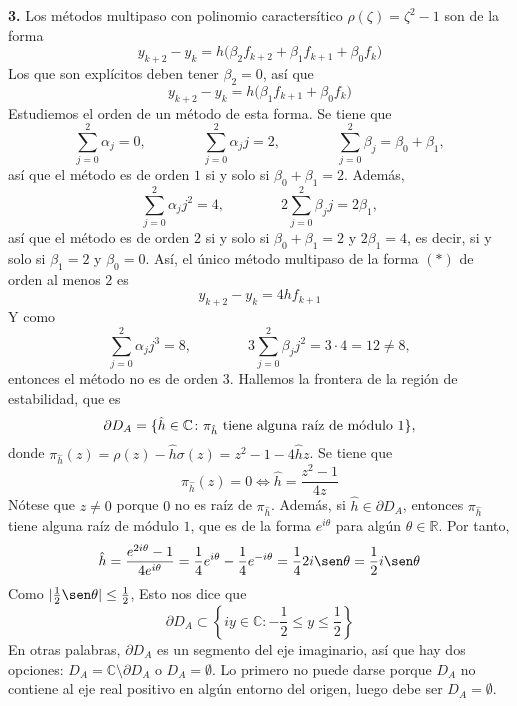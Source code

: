 \documentclass[11pt]{report}
\newcommand{\R}{\mathbb R}
\newcommand{\C}{\mathbb C}
\begin{document}
\textbf{3. } Los métodos multipaso con polinomio caractersítico $\rho(\zeta) = \zeta^2-1$ son de la forma
\[y_{k+2}-y_k = h\bigl(\beta_2f_{k+2}+\beta_1f_{k+1}+\beta_0f_k\bigr)\]
Los que son explícitos deben tener $\beta_2 = 0$, así que
\[y_{k+2}-y_k = h\bigl(\beta_1f_{k+1}+\beta_0f_k\bigr) \tag{$\ast$}\]
Estudiemos el orden de un método de esta forma. Se tiene que
\[\sum_{j=0}^2 \alpha_j = 0, \qquad \qquad \sum_{j=0}^2 \alpha_jj = 2, \qquad \qquad \sum_{j=0}^2\beta_j = \beta_0 +\beta_1,\]
así que el método es de orden $1$ si y solo si $\beta_0+\beta_1 = 2$. Además,
\[\sum_{j=0}^2\alpha_jj^2 = 4, \qquad \qquad 2\sum_{j=0}^2 \beta_jj = 2\beta_1,\]
así que el método es de orden $2$ si y solo si $\beta_0+\beta_1 = 2$ y $2\beta_1 = 4$, es decir, si y solo si $\beta_1 = 2$ y $\beta_0 = 0$. Así, el único método multipaso de la forma $(\ast)$ de orden al menos $2$ es
\[y_{k+2}-y_k = 4hf_{k+1}\]
Y como
\[\sum_{j=0}^2 \alpha_jj^3 = 8, \qquad \qquad 3\sum_{j=0}^2 \beta_jj^2 = 3 \cdot 4 = 12 \neq 8,\]
entonces el método no es de orden $3$. Hallemos la frontera de la región de estabilidad, que es
\[\partial D_A = \{\hat{h} \in \C \colon \pi_{\hat{h}} \textup{ tiene alguna raíz de módulo } 1\},\]
donde $\pi_{\hat{h}}(z)=\rho(z)-\hat{h}\sigma(z)=z^2-1-4\hat{h}z$. Se tiene que
\[\pi_{\hat{h}}(z)=0 \iff \hat{h} = \frac{z^2-1}{4z}\]
Nótese que $z \neq 0$ porque $0$ no es raíz de $\pi_{\hat{h}}$. Además, si $\hat{h} \in \partial D_A$, entonces $\pi_{\hat{h}}$ tiene alguna raíz de módulo $1$, que es de la forma $e^{i\theta}$ para algún $\theta \in \R$. Por tanto,
\[\hat{h}=\frac{e^{2i\theta}-1}{4e^{i\theta}} = \frac{1}{4}e^{i\theta} - \frac{1}{4}e^{-i\theta} = \frac{1}{4}2i\sen \theta = \frac{1}{2}i\sen \theta\]
Como $|\frac{1}{2}\sen\theta| \leq \frac{1}{2}$, Esto nos dice que
\[\partial D_A \subset \left\{iy  \in \C \colon -\frac{1}{2} \leq y \leq \frac{1}{2}\right\}\]
En otras palabras, $\partial D_A$ es un segmento del eje imaginario, así que hay dos opciones: $D_A = \C \setminus \partial D_A$ o $D_A = \emptyset$. Lo primero no puede darse porque $D_A$ no contiene al eje real positivo en algún entorno del origen, luego debe ser $D_A = \emptyset$.
\end{document}
